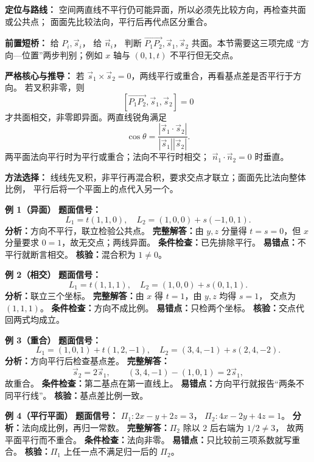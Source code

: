 \begin{knowledgeBox}
\textbf{定位与路线：}
空间两直线不平行仍可能异面，所以必须先比较方向，再检查共面或公共点；
面面先比较法向，平行后再代点区分重合。

\textbf{前置短桥：}
给 \(P_i,\vec s_i\)，
给 \(\vec n_i\)，
判断
\(\overrightarrow{P_1P_2},\vec s_1,\vec s_2\) 共面。本节需要这三项完成
“方向—位置”两步判别；例如 \(x\) 轴与 \((0,1,t)\) 不平行但无交点。

\textbf{严格核心与推导：}
若 \(\vec s_1\times\vec s_2=0\)，两线平行或重合，再看基点差是否平行于方向。
若叉积非零，则
\[
[\overrightarrow{P_1P_2},\vec s_1,\vec s_2]=0
\]
才共面相交，非零即异面。两直线锐角满足
\[
\cos\theta=\frac{|\vec s_1\cdot\vec s_2|}{|\vec s_1||\vec s_2|}.
\]
两平面法向平行时为平行或重合；法向不平行时相交；
\(\vec n_1\cdot\vec n_2=0\) 时垂直。

\textbf{方法选择：}
线线先叉积，非平行再混合积，要求交点才联立；面面先比法向整体比例，
平行后将一个平面上的点代入另一个。

\textbf{例 1（异面）}
\textbf{题面信号：}
\[
L_1=t(1,1,0),\quad L_2=(1,0,0)+s(-1,0,1).
\]
\textbf{分析：}方向不平行，联立检验公共点。
\textbf{完整解答：}由 \(y,z\) 分量得 \(t=s=0\)，但 \(x\) 分量要求
\(0=1\)，故无交点；两线异面。
\textbf{条件检查：}已先排除平行。
\textbf{易错点：}不平行就断言相交。
\textbf{核验：}混合积为 \(1\ne0\)。

\textbf{例 2（相交）}
\textbf{题面信号：}
\[
L_1=t(1,1,1),\quad L_2=(1,0,0)+s(0,1,1).
\]
\textbf{分析：}联立三个坐标。
\textbf{完整解答：}由 \(x\) 得 \(t=1\)，由 \(y,z\) 均得 \(s=1\)，
交点为 \((1,1,1)\)。
\textbf{条件检查：}方向不成比例。
\textbf{易错点：}只检两个坐标。
\textbf{核验：}交点代回两式均成立。

\textbf{例 3（重合）}
\textbf{题面信号：}
\[
L_1=(1,0,1)+t(1,2,-1),\quad
L_2=(3,4,-1)+s(2,4,-2).
\]
\textbf{分析：}方向平行后检查基点差。
\textbf{完整解答：}
\[
\vec s_2=2\vec s_1,\qquad
(3,4,-1)-(1,0,1)=2\vec s_1,
\]
故重合。
\textbf{条件检查：}第二基点在第一直线上。
\textbf{易错点：}方向平行就报告“两条不同平行线”。
\textbf{核验：}基点差比例一致。

\textbf{例 4（平行平面）}
\textbf{题面信号：}
\(\Pi_1:2x-y+2z=3\)，
\(\Pi_2:4x-2y+4z=1\)。
\textbf{分析：}法向成比例，再归一常数。
\textbf{完整解答：}\(\Pi_2\) 除以 \(2\) 后右端为 \(1/2\ne3\)，
故两平面平行而不重合。
\textbf{条件检查：}法向非零。
\textbf{易错点：}只比较前三项系数就写重合。
\textbf{核验：}\(\Pi_1\) 上任一点不满足归一后的 \(\Pi_2\)。


\end{knowledgeBox}
